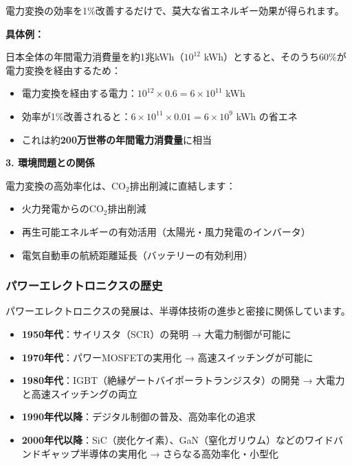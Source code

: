 電力変換の効率を1\%改善するだけで、莫大な省エネルギー効果が得られます。

\begin{screen}
\textbf{具体例：}

日本全体の年間電力消費量を約1兆kWh（$10^{12}$ kWh）とすると、そのうち60\%が電力変換を経由するため：

\begin{itemize}
\item 電力変換を経由する電力：$10^{12} \times 0.6 = 6 \times 10^{11}$ kWh
\item 効率が1\%改善されると：$6 \times 10^{11} \times 0.01 = 6 \times 10^{9}$ kWh の省エネ
\item これは約\textbf{200万世帯の年間電力消費量}に相当
\end{itemize}
\end{screen}

\textbf{3. 環境問題との関係}

電力変換の高効率化は、CO$_2$排出削減に直結します：

\begin{itemize}
\item 火力発電からのCO$_2$排出削減
\item 再生可能エネルギーの有効活用（太陽光・風力発電のインバータ）
\item 電気自動車の航続距離延長（バッテリーの有効利用）
\end{itemize}

\subsubsection{パワーエレクトロニクスの歴史}

パワーエレクトロニクスの発展は、半導体技術の進歩と密接に関係しています。

\begin{itemize}
\item \textbf{1950年代}：サイリスタ（SCR）の発明 → 大電力制御が可能に
\item \textbf{1970年代}：パワーMOSFETの実用化 → 高速スイッチングが可能に
\item \textbf{1980年代}：IGBT（絶縁ゲートバイポーラトランジスタ）の開発 → 大電力と高速スイッチングの両立
\item \textbf{1990年代以降}：デジタル制御の普及、高効率化の追求
\item \textbf{2000年代以降}：SiC（炭化ケイ素）、GaN（窒化ガリウム）などのワイドバンドギャップ半導体の実用化 → さらなる高効率化・小型化
\end{itemize}

